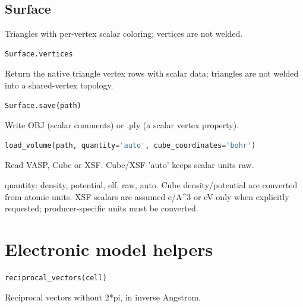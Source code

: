 \subsection{Surface}

Triangles with per-vertex scalar coloring; vertices are not welded.

\begin{samepage}

\begin{lstlisting}[language=Python]
Surface.vertices
\end{lstlisting}

Return the native triangle vertex rows with scalar data; triangles are not welded into a shared-vertex topology.

\end{samepage}



\begin{samepage}

\begin{lstlisting}[language=Python]
Surface.save(path)
\end{lstlisting}

Write OBJ (scalar comments) or .ply (a scalar vertex property).

\end{samepage}



\begin{samepage}

\begin{lstlisting}[language=Python]
load_volume(path, quantity='auto', cube_coordinates='bohr')
\end{lstlisting}

Read VASP, Cube or XSF. Cube/\allowbreak{}XSF 'auto' keeps scalar units raw.

quantity: density, potential, elf, raw, auto. Cube density/\allowbreak{}potential are
converted from atomic units. XSF scalars are assumed e/\allowbreak{}A\textasciicircum{}3 or eV only
when explicitly requested; producer-specific units must be converted.

\end{samepage}



\section{Electronic model helpers}

\begin{samepage}

\begin{lstlisting}[language=Python]
reciprocal_vectors(cell)
\end{lstlisting}

Reciprocal vectors without 2*pi, in inverse Angstrom.

\end{samepage}



